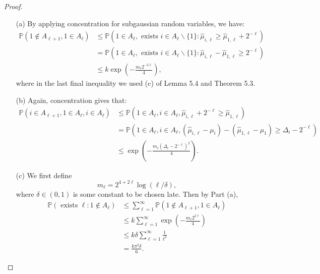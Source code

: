\begin{proof}
    \begin{enumerate}
        \item[(a)] By applying concentration for subgaussian random variables, we have:
        \begin{equation*}
            \begin{aligned}
                \mathbb{P}\left(1 \notin A_{\ell+1}, 1 \in A_{\ell}\right) & \leq \mathbb{P}\left(1 \in A_{\ell}, \text { exists } i \in A_{\ell} \backslash\{1\}: \hat{\mu}_{i, \ell} \geq \hat{\mu}_{1, \ell}+2^{-\ell}\right) \\
                &=\mathbb{P}\left(1 \in A_{\ell}, \text { exists } i \in A_{\ell} \backslash\{1\}: \hat{\mu}_{i, \ell}-\hat{\mu}_{1, \ell} \geq 2^{-\ell}\right) \\
                & \leq k \exp \left(-\frac{m_{\ell} 2^{-2 \ell}}{4}\right),
            \end{aligned}
        \end{equation*} 
        where in the last final inequality we used (c) of Lemma 5.4 and Theorem 5.3.

        \item[(b)] Again, concentration gives that:
        \begin{equation*}
            \begin{aligned}
                \mathbb{P}\left(i \in A_{\ell+1}, 1 \in A_{\ell}, i \in A_{\ell}\right) &\leq \mathbb{P}\left(1 \in A_{\ell}, i \in A_{\ell}, \hat{\mu}_{i, \ell}+2^{-\ell} \geq \hat{\mu}_{1, \ell}\right) \\
                &=\mathbb{P}\left(1 \in A_{\ell}, i \in A_{\ell},\left(\hat{\mu}_{i, \ell}-\mu_{i}\right)-\left(\hat{\mu}_{1, \ell}-\mu_{1}\right) \geq \Delta_{i}-2^{-\ell}\right) \\
                & \leq \exp \left(-\frac{m_{\ell}\left(\Delta_{i}-2^{-\ell}\right)^{2}}{4}\right).
            \end{aligned}
        \end{equation*}

        \item[(c)] We first define
        $$m_{\ell}=2^{4+2 \ell} \log (\ell / \delta),$$
        where $\delta \in(0,1)$ is some constant to be chosen late.
        Then by Part (a),
        \begin{equation*}
            \begin{aligned}
                \mathbb{P}\left(\text { exists } \ell: 1 \notin A_{\ell}\right) & \leq \sum_{\ell=1}^{\infty} \mathbb{P}\left(1 \notin A_{\ell+1}, 1 \in A_{\ell}\right) \\
                & \leq k \sum_{\ell=1}^{\infty} \exp \left(-\frac{m_{\ell} 2^{2 \ell}}{4}\right) \\
                & \leq k \delta \sum_{\ell=1}^{\infty} \frac{1}{\ell^{2}} \\
                &=\frac{k \pi^{2} \delta}{6}.
            \end{aligned}
        \end{equation*}


\end{enumerate}
\end{proof}
